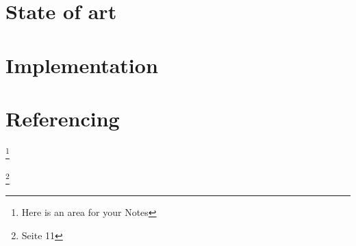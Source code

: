 \documentclass[a4paper, 12pt, oneside, BCOR1cm,toc=chapterentrywithdots]{scrbook}
\begin{document}
\chapter{State of art}

\chapter{Implementation}

\chapter{Referencing}

\blindtext \cite{autorenrichtlinien}

\blindtext \footnote{Here is an area for your Notes}

\blindtext \footnote{\cite{lnilatex} Seite 11}
\blindtext \cite{lnilatex}
\blindtext \cite{autorenrichtlinien,pepper1992grundlagen,chen2001audiovisual}






\printindex
\end{document}
